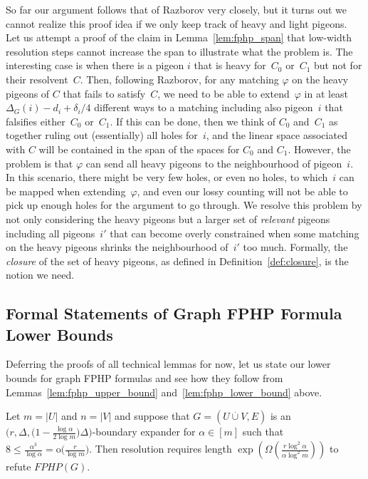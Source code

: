 \documentclass{theoretics}
\newcommand{\Littleoh}[1]{\mathrm{o} \bigl( #1 \bigr)}
\newcommand{\BIGOMEGA}[1]{\Omega \left( #1 \right)}
\newcommand{\setsize}[1]{\lvert#1\rvert}
\newcommand{\disjointunion}{\overset{.}{\cup}}
\newcommand{\introduceterm}[1]{{\emph{#1}}}
\newcommand{\reflem}[1]{Lemma~\ref{#1}}
\newcommand{\reftwolems}[2]{Lemmas~\ref{#1} and~\ref{#2}}
\newcommand{\refdef}[1]{Definition~\ref{#1}}
\newcommand{\formulaformat}[1]{\mathit{#1}}
\newcommand{\graphfphpnot}[1][G]{\formulaformat{FPHP}({#1})}
\newcommand{\heavy}{heavy\xspace}
\newcommand{\light}{light\xspace}
\newcommand{\GFPHP}{G\text{-}FPHP}
\renewcommand{\GFPHP}{\graphfphpnot[G]}
\renewcommand{\deg}[2][XXXXXXXXXXXX]{\Delta_{#1}(#2)}
\newcommand{\dimLi}{\deg[G]{i} - d_i + \delta_i/4}
\newcommand{\GdegMax}{\Delta}
\newcommand{\matcha}{\varphi}
\newcommand{\squeezesubsection}[1]{\subsection{#1}}
\numberwithin{equation}{section}
\begin{document}
So far our argument follows that of Razborov very closely, but
it turns out we cannot realize this proof idea if we only keep track
of \heavy and \light pigeons. Let us attempt a proof of the claim in
\reflem{lem:fphp_span} that low-width resolution steps cannot increase
the span to illustrate what the problem is.
The interesting case is when there is a pigeon $i$ that is \heavy
for~$C_0$ or~$C_1$
but not for their resolvent~$C$. 
Then, following Razborov, for any matching $\matcha$ on the \heavy
pigeons of $C$ that  fails to satisfy~$C$, 
we need to be able to extend~$\matcha$ in at
least $\dimLi$ different ways to a matching including also pigeon~$i$
that falsifies either~$C_0$ or~$C_1$. If this can be done, then we think
of $C_0$ and~$C_1$ as together ruling out (essentially) all holes
for~$i$, and  the linear space associated with $C$ will be contained
in the span of the spaces for $C_0$ and $C_1$.
However, the problem is that $\matcha$ can send all \heavy pigeons to
the neighbourhood of pigeon~$i$. In this scenario, there might be very
few holes, or even no holes, to which~$i$ can be mapped when
extending~$\matcha$, and even our lossy counting will not be able to
pick up enough holes for the argument to go through.
We resolve this problem by not only considering the \heavy pigeons but
a larger set of \introduceterm{relevant} pigeons including all pigeons~$i'$
that can become overly constrained when some matching on the \heavy pigeons
shrinks the neighbourhood of~$i'$ too much.
Formally, the \introduceterm{closure} of the set of \heavy pigeons,
as defined in \refdef{def:closure},
is the notion we need.


 
\squeezesubsection{Formal Statements of Graph FPHP Formula Lower Bounds}
\label{sec:fphp_results}


Deferring the proofs of all technical lemmas for now, 
let us state our lower bounds for graph FPHP formulas and see how they
follow from  
\reftwolems{lem:fphp_upper_bound}{lem:fphp_lower_bound}
above.


\begin{theorem} \label{thm:main}
  Let
  $m = \setsize{ U }$ and $n = \setsize{ V }$ and suppose that
  $
  G = (U 
  \disjointunion
  V, E)
  $
  is an
  $\bigl( 
  r, 
  \GdegMax, 
  \bigl(1 - \frac{ \log \alpha}{ 2 \log m} \bigr)\GdegMax \bigr)
  $-boundary 
  expander
  for $\alpha \in [m]$ such that 
  $8 \le \frac{ \alpha^3 }{ \log \alpha} = \Littleoh{\frac{ r }{ \log m }}$.
  Then resolution requires length
  $\exp \left( \BIGOMEGA {\frac{ r \log^2\alpha }{ \alpha \log^2 m }} \right)$
  to refute $\GFPHP$.
\end{theorem}
\end{document}
